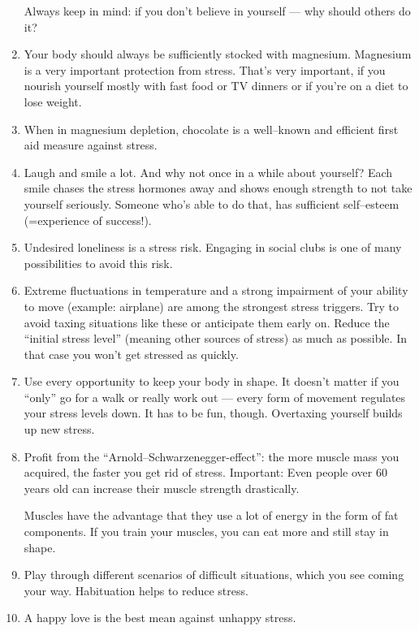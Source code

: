 \documentclass[../main.tex]{subfiles}
\begin{document}
\begin{enumerate}
Always keep in mind: if you don't believe in yourself --- why should others do it?
\item Your body should always be sufficiently stocked with magnesium. Magnesium is a very important protection from stress. That's very important, if you nourish yourself mostly with fast food or TV dinners or if you're on a diet to lose weight.
\item When in magnesium depletion, chocolate is a well--known and efficient first aid measure against stress.
\item Laugh and smile a lot. And why not once in a while about yourself? Each smile chases the stress hormones away and shows enough strength to not take yourself seriously. Someone who's able to do that, has sufficient self--esteem (=experience of success!).
\item Undesired loneliness is a stress risk. Engaging in social clubs is one of many possibilities to  avoid this risk.
\item Extreme fluctuations in temperature and a strong impairment of your ability to move (example: airplane) are among the strongest stress triggers. Try to avoid taxing situations like these or  anticipate them early on. Reduce the ``initial stress level'' (meaning other sources of stress) as much as possible. In that case you won't get stressed as quickly.
\item Use every opportunity to keep your body in shape. It doesn't matter if you ``only'' go for a walk or really work out --- every form of movement regulates your stress levels down. It has to be fun, though. Overtaxing yourself builds up new stress.
\item Profit from the ``Arnold--Schwarzenegger-effect'': the more muscle mass you acquired, the faster you get rid of stress. Important: Even people over 60 years old  can increase their muscle strength drastically.

Muscles have the advantage that they use a lot of energy in the form of  fat components. If you train your muscles, you can eat more and still stay in shape.
\item Play through different scenarios of difficult situations, which you see coming your way. Habituation helps to reduce stress.
\item A happy love is the best mean against unhappy stress.
\end{enumerate}
\end{document}
